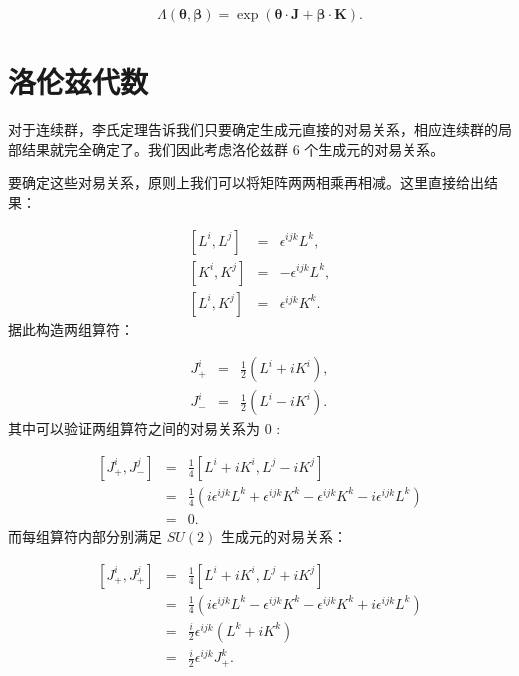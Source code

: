 \documentclass[10pt,UTF8]{ctexart}
\begin{document}
\begin{equation}
\Lambda\left(\bm{\theta},\bm{\beta}\right)=\exp\left(\bm{\theta}\cdot\bm{J}+\bm{\beta}\cdot\bm{K}\right).
\end{equation}


\section*{洛伦兹代数}
\noindent
对于连续群，李氏定理告诉我们只要确定生成元直接的对易关系，相应连续群的局部结果就完全确定了。我们因此考虑洛伦兹群 6 个生成元的对易关系。

要确定这些对易关系，原则上我们可以将矩阵两两相乘再相减。这里直接给出结果：

\begin{eqnarray}
\left[L^{i},L^{j}\right] & = & \epsilon^{ijk}L^{k},\\
\left[K^{i},K^{j}\right] & = & -\epsilon^{ijk}L^{k},\\
\left[L^{i},K^{j}\right] & = & \epsilon^{ijk}K^{k}.
\end{eqnarray}
据此构造两组算符：

\begin{eqnarray}
J_{+}^{i} & = & \frac{1}{2}\left(L^{i}+iK^{i}\right),\\
J_{-}^{i} & = & \frac{1}{2}\left(L^{i}-iK^{i}\right).
\end{eqnarray}
其中可以验证两组算符之间的对易关系为 0 :

\begin{eqnarray}
\left[J_{+}^{i},J_{-}^{j}\right] & = & \frac{1}{4}\left[L^{i}+iK^{i},L^{j}-iK^{j}\right]\nonumber \\
 & = & \frac{1}{4}\left(i\epsilon^{ijk}L^{k}+\epsilon^{ijk}K^{k}-\epsilon^{ijk}K^{k}-i\epsilon^{ijk}L^{k}\right)\nonumber \\
 & = & 0.
\end{eqnarray}
而每组算符内部分别满足 $SU(2)$ 生成元的对易关系：

\begin{eqnarray}
\left[J_{+}^{i},J_{+}^{j}\right] & = & \frac{1}{4}\left[L^{i}+iK^{i},L^{j}+iK^{j}\right]\nonumber \\
 & = & \frac{1}{4}\left(i\epsilon^{ijk}L^{k}-\epsilon^{ijk}K^{k}-\epsilon^{ijk}K^{k}+i\epsilon^{ijk}L^{k}\right)\nonumber \\
 & = & \frac{i}{2}\epsilon^{ijk}\left(L^{k}+iK^{k}\right)\nonumber \\
 & = & \frac{i}{2}\epsilon^{ijk}J_{+}^{k}.
\end{eqnarray}
\end{document}
